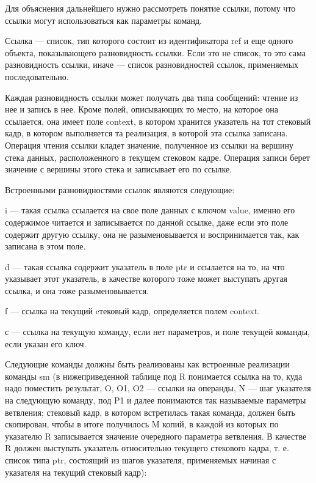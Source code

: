 \documentclass{report}
\begin{document}

    Для объяснения дальнейшего нужно рассмотреть понятие ссылки, потому что ссылки могут использоваться как параметры команд.

    Ссылка --- список, тип которого состоит из идентификатора ref и еще одного объекта, показывающего разновидность ссылки. Если это не список, то это сама разновидность ссылки, иначе --- список разновидностей ссылок, применяемых последовательно.

    Каждая разновидность ссылки может получать два типа сообщений:  чтение из нее и запись в нее. Кроме полей, описывающих то место, на которое она ссылается, она имеет поле context, в котором хранится указатель на тот стековый кадр, в котором выполняется та реализация, в которой эта ссылка записана. Операция чтения ссылки кладет значение, полученное из ссылки на вершину стека данных, расположенного в текущем стековом кадре. Операция записи берет значение с вершины этого стека и записывает его по ссылке.

    Встроенными разновидностями ссылок являются следующие:

    i --- такая ссылка ссылается на свое поле данных с ключом value, именно его содержимое читается и записывается по данной ссылке, даже если это поле содержит другую ссылку, она не разыменовывается и воспринимается так, как записана в этом поле.

    d --- такая ссылка содержит указатель в поле ptr и ссылается на то, на что указывает этот указатель, в качестве которого тоже может выступать другая ссылка, и она тоже разыменовывается.

    f --- ссылка на текущий cтековый кадр, определяется полем context.

    с --- ссылка на текущую команду, если нет параметров, и поле текущей команды, если указан его ключ.

    Следующие команды должны быть реализованы как встроенные реализации команды sm (в нижеприведенной таблице под R понимается ссылка на то, куда надо поместить результат, O, O1, O2 --- ссылки на операнды, N --- шаг указателя на следующую команду, под P1 и далее понимаются так называемые параметры ветвления; стековый кадр, в котором встретилась такая команда, должен быть скопирован, чтобы в итоге получилось M копий, в каждой из которых по указателю R записывается значение очередного параметра ветвления. В качестве R должен выступать указатель относительно текущего стекового кадра, т. е. список типа ptr, состоящий из шагов указателя, применяемых начиная с указателя на текущий стековый кадр):
\end{document}
